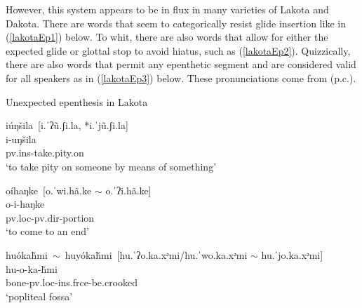 However, this system appears to be in flux in many varieties of Lakota and Dakota. There are words that seem to categorically resist glide insertion like in (\ref{lakotaEp1}) below. To whit, there are also words that allow for either the expected glide or glottal stop to avoid hiatus, such as (\ref{lakotaEp2}). Quizzically, there are also words that permit any epenthetic segment and are considered valid for all speakers as in (\ref{lakotaEp3}) below. These pronunciations come from \citeauthor{mirzayan2010} (p.c.).

\begin{exe}
\item\label{lakotaEp} Unexpected epenthesis in Lakota
\begin{xlist}

\item\label{lakotaEp1} \glll iúŋšila~\textnormal{[i.ˈʔũ.ʃi.la, *i.ˈjũ.ʃi.la]}\\
	i-uŋšila\\
	pv.ins-\textnormal{take.pity.on}\\
\glt	`to take pity on someone by means of something' \citep[241]{ullrich2011}

\item\label{lakotaEp2} \glll oíhaŋke~\textnormal{[o.ˈwi.hã.ke $\sim$ o.ˈʔi.hã.ke]}\\
	o-i-haŋke\\
	pv.loc-pv.dir-\textnormal{portion}\\
\glt	`to come to an end' \citep[413]{ullrich2011}

\item\label{lakotaEp3} \glll huókaȟmi~$\sim$~huyókaȟmi~\textnormal{[hu.ˈʔo.ka.xᵊmi/hu.ˈwo.ka.xᵊmi $\sim$ hu.ˈjo.ka.xᵊmi]}\\
	hu-o-ka-ȟmi\\
	\textnormal{bone}-pv.loc-ins.frce-\textnormal{be.crooked}\\
\glt	`popliteal fossa' \citep[177]{ullrich2011}

\end{xlist}
\end{exe}

